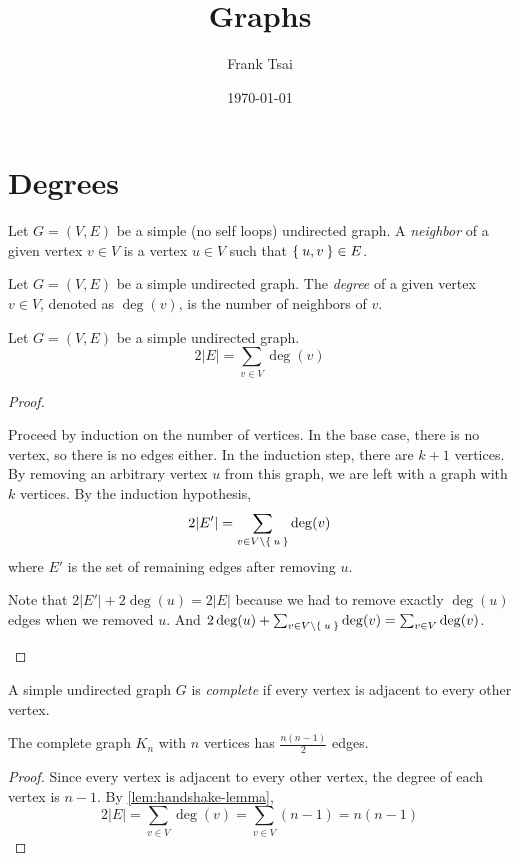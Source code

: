 \documentclass{zett}
\title{Graphs}
\author{Frank Tsai}
\date{\today}
\begin{document}
\maketitle
\tableofcontents

\section{Degrees}
\label{sec:degrees}

\begin{defn}
  Let $G = (V,E)$ be a simple (no self loops) undirected graph.
  A \emph{neighbor} of a given vertex $v \in V$ is a vertex $u \in V$ such that $\Set{u,v} \in E$.
\end{defn}

\begin{defn}
  Let $G = (V,E)$ be a simple undirected graph.
  The \emph{degree} of a given vertex $v \in V$, denoted as $\deg(v)$, is the number of neighbors of $v$.
\end{defn}

\begin{lem}
  \label{lem:handshake-lemma}
  Let $G = (V,E)$ be a simple undirected graph.
  \[
    2|E| = \sum_{v \in V}\deg(v)
  \]
\end{lem}
\begin{proof}
  \begin{node}
    Proceed by induction on the number of vertices.
    In the base case, there is no vertex, so there is no edges either.
    In the induction step, there are $k + 1$ vertices.
    By removing an arbitrary vertex $u$ from this graph, we are left with a graph with $k$ vertices.
    By the induction hypothesis,
    \[
      2|E'| = \sum_{v \in V \setminus \Set{u}}\deg(v)
    \]
    where $E'$ is the set of remaining edges after removing $u$.
  \end{node}
  \begin{node}
    Note that $2|E'| + 2\deg(u) = 2|E|$ because we had to remove exactly $\deg(u)$ edges when we removed $u$.
    And $2\deg(u) + \sum_{v \in V \setminus \Set{u}}\deg(v) = \sum_{v \in V}\deg(v)$.
  \end{node}
\end{proof}

\begin{defn}
  A simple undirected graph $G$ is \emph{complete} if every vertex is adjacent to every other vertex.
\end{defn}

\begin{cor}
  The complete graph $K_{n}$ with $n$ vertices has $\frac{n(n-1)}{2}$ edges.
\end{cor}
\begin{proof}
  Since every vertex is adjacent to every other vertex, the degree of each vertex is $n - 1$.
  By \cref{lem:handshake-lemma},
  \[
    2|E| = \sum_{v \in V}\deg(v) = \sum_{v \in V}(n-1) = n(n-1)
  \]
\end{proof}
\end{document}

